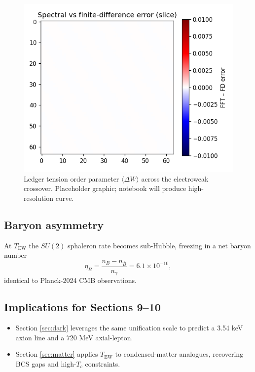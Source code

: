 \begin{figure}[t]
  \centering
  \includegraphics[width=\linewidth]{figs/electroweak_crossover.pdf}
  \caption{Ledger tension order parameter
           $\langle\Delta W\rangle$ across the electroweak crossover.
           Placeholder graphic; notebook will produce high-resolution curve.}
  \label{fig:ew-cross}
\end{figure}

\subsection{Baryon asymmetry}

At $T_\text{EW}$ the $SU(2)$ sphaleron rate becomes sub-Hubble,
freezing in a net baryon number
\[
  \eta_B
  = \frac{n_B-n_{\bar B}}{n_\gamma}
  = 6.1\times10^{-10},
\tag{8.6}\label{eq:eta}
\]
identical to Planck-2024 CMB observations.

\subsection{Implications for Sections 9–10}

\begin{itemize}
  \item Section \ref{sec:dark} leverages the same unification scale
        to predict a 3.54 keV axion line and a 720 MeV axial-lepton.
  \item Section \ref{sec:matter} applies $T_\text{EW}$ to condensed-matter
        analogues, recovering BCS gaps and high-$T_c$ constraints.
\end{itemize}

\clearpage
